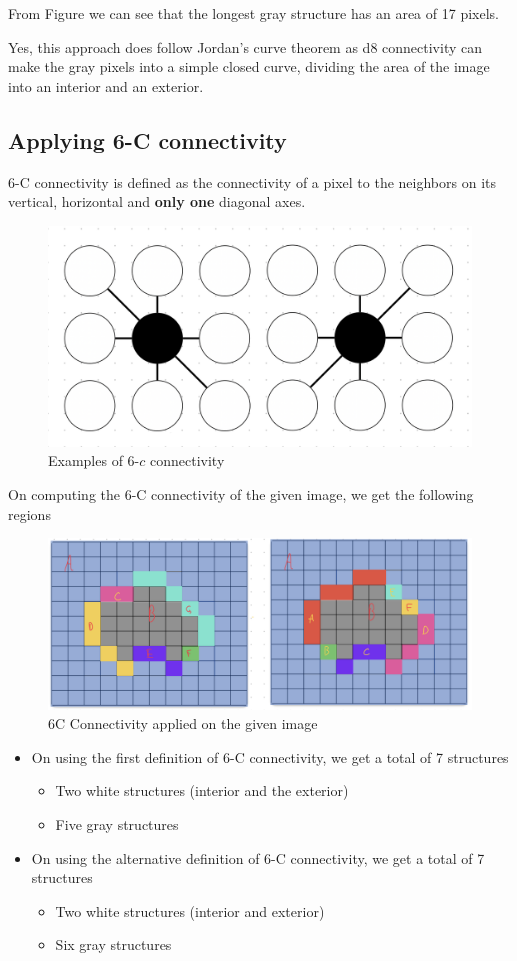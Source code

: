 \documentclass[a4paper,11pt]{article}
\begin{document}
From Figure %
we can see that the longest gray structure has an area of 17 pixels. \newline

Yes, this approach does follow Jordan's curve theorem as d8 connectivity can make the gray pixels into a simple closed curve, dividing the area of the image into an interior and an exterior.



\subsection{Applying 6-C connectivity}

6-C connectivity is defined as the connectivity of a pixel to the neighbors on its vertical, horizontal and \textbf{only one} diagonal axes.
\newline
\begin{figure}[H]
    \centering
    \includegraphics[width=0.6\linewidth]{figs/6c_connectivity.png}
    \caption{Examples of 6-$c$ connectivity}
\end{figure}
On computing the 6-C connectivity of the given image, we get the following regions
\begin{figure}[h]
    \centering
    \includegraphics[width=0.8\linewidth]{figs/6c_connected_image.png}
    \caption{6C Connectivity applied on the given image}
\end{figure}
\begin{itemize}
    \item On using the first definition of 6-C connectivity, we get a total of 7 structures
    \begin{itemize}
        \item Two white structures (interior and the exterior)
        \item Five gray structures
    \end{itemize}
    \item On using the alternative definition of 6-C connectivity, we get a total of 7 structures
    \begin{itemize}
        \item Two white structures (interior and exterior)
        \item Six gray structures
    \end{itemize}
\end{itemize}
\end{document}
